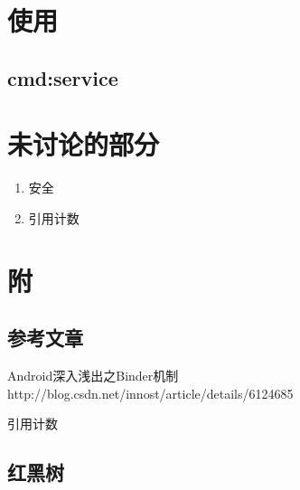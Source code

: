 \documentclass[a4paper,11pt]{article}
\begin{document}
\begin{CJK*}{UTF8}{gbsn}
\section{使用}
    \subsection{cmd:service}


\section{未讨论的部分}
    \begin{enumerate}
        \item 安全
        \item 引用计数
    \end{enumerate}

\section{附}
    \subsection{参考文章}
    \begin{description}
        \item Android深入浅出之Binder机制 \\http://blog.csdn.net/innost/article/details/6124685
        \item 引用计数
    \end{description}
    \subsection{红黑树}
\end{CJK*} %
\end{document}
